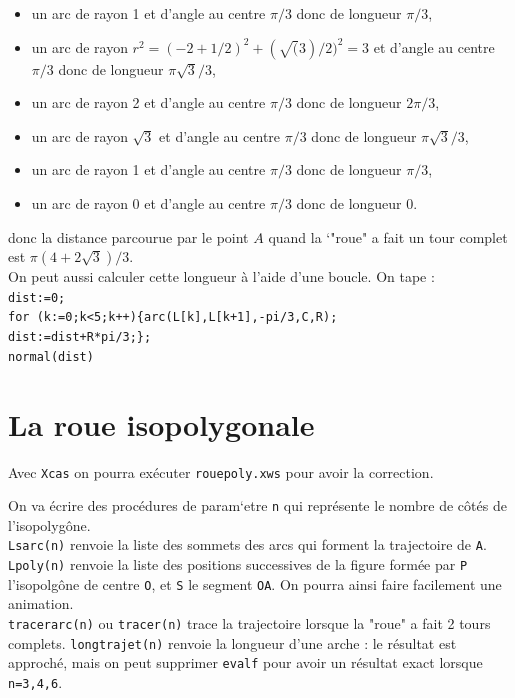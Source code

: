 \documentclass[a4paper,11pt]{book}
\begin{document}
\begin{itemize}
\item un arc de rayon 1 et d'angle au centre $\pi/3$ donc de longueur $\pi/3$, 
\item un arc de rayon $r^2=(-2+1/2)^2+(\sqrt(3)/2)^2=3$ et d'angle au centre 
$\pi/3$ donc de longueur $\pi\sqrt 3/3$, 
\item un arc de rayon 2 et d'angle au centre $\pi/3$ donc de longueur 
$2\pi/3$, 
\item un arc de rayon $\sqrt 3$ et d'angle au centre $\pi/3$ donc de 
longueur $\pi\sqrt 3/3$, 
\item un arc de rayon 1 et d'angle au centre $\pi/3$ donc de longueur $\pi/3$, 
\item un arc de rayon 0 et d'angle au centre $\pi/3$ donc de longueur $0$.
\end{itemize}
donc la distance parcourue par le point $A$ quand la `"roue" a fait un tour 
complet est $\pi(4+2\sqrt 3)/3$.\\
On peut aussi calculer cette longueur \`a l'aide d'une boucle.
On tape :\\
{\tt dist:=0;}\\
{\tt for (k:=0;k<5;k++)\{arc(L[k],L[k+1],-pi/3,C,R);\\
\hspace*{4cm} dist:=dist+R*pi/3;\};}\\
{\tt normal(dist)}
\section{La roue isopolygonale}
Avec {\tt Xcas} on pourra ex\'ecuter {\tt rouepoly.xws} pour avoir la 
correction.

On va \'ecrire des proc\'edures de param`etre {\tt n} qui repr\'esente le 
nombre de c\^ot\'es de l'isopolyg\^one.\\
{\tt  Lsarc(n)} renvoie la liste des sommets des arcs qui forment la 
trajectoire de {\tt A}.\\
{\tt Lpoly(n)} renvoie la liste des positions successives de la figure form\'ee
par {\tt  P} l'isopolg\^one de centre {\tt O}, et {\tt  S} le segment 
{\tt OA}. On pourra ainsi faire facilement une animation.\\
{\tt tracerarc(n)} ou {\tt  tracer(n)} trace la trajectoire lorsque
la "roue" a fait 2 tours complets.
{\tt  longtrajet(n)} renvoie la longueur d'une arche : le r\'esultat est 
approch\'e, mais on peut supprimer {\tt evalf} pour avoir un r\'esultat exact 
lorsque {\tt n=3,4,6}.
\end{document}
